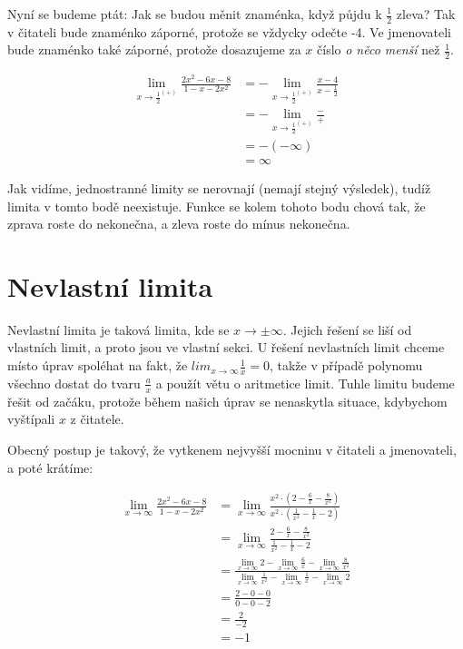 \documentclass[]{article}
\begin{document}
	Nyní se budeme ptát: Jak se budou měnit znaménka, když půjdu k $\frac{1}{2}$ zleva? Tak v čitateli bude znaménko záporné, protože se vždycky odečte -4. Ve jmenovateli bude znaménko také záporné, protože dosazujeme za $x$ číslo \textit{o něco menší} než $\frac{1}{2}$.
	
	\begin{align*}
		\lim_{x \to \frac{1}{2}^{(+)}} \frac{2x^2-6x-8}{1-x-2x^2} &= - \lim_{x \to \frac{1}{2}^{(+)}} \frac{x - 4}{x - \frac{1}{2}} \\
		&= - \lim_{x \to \frac{1}{2}^{(+)}} \frac{-}{+} \\
		&= - (- \infty) \\
		&= \infty
	\end{align*}
	
	Jak vidíme, jednostranné limity se nerovnají (nemají stejný výsledek), tudíž limita v tomto bodě neexistuje. Funkce se kolem tohoto bodu chová tak, že zprava roste do nekonečna, a zleva roste do mínus nekonečna.
	
	\pagebreak
	
	\section{Nevlastní limita}
	Nevlastní limita je taková limita, kde se $x \to \pm \infty$. Jejich řešení se liší od vlastních limit, a proto jsou ve vlastní sekci. U řešení nevlastních limit chceme místo úprav spoléhat na fakt, že $lim_{x\to\infty} \frac{1}{x} = 0$, takže v případě polynomu všechno dostat do tvaru $\frac{a}{x}$ a použít větu o aritmetice limit. Tuhle limitu budeme řešit od začáku, protože během našich úprav se nenaskytla situace, kdybychom vyštípali $x$ z čitatele.
	
	Obecný postup je takový, že vytkenem nejvyšší mocninu v čitateli a jmenovateli, a poté krátíme:
	
		\begin{align*}
		\lim_{x \to \infty} \frac{2x^2-6x-8}{1-x-2x^2} 
		&= \lim_{x \to \infty} \frac{x^2 \cdot (2 - \frac{6}{x} - \frac{8}{x^2})}{x^2 \cdot (\frac{1}{x^2}-\frac{1}{x}-2)} \\
		&= \lim_{x \to \infty} \frac{2 - \frac{6}{x} - \frac{8}{x^2}}{\frac{1}{x^2}-\frac{1}{x}-2} \\
		&= \frac{\lim_{x \to \infty} 2 - \lim_{x \to \infty} \frac{6}{x} - \lim_{x \to \infty} \frac{8}{x^2}}{\lim_{x \to \infty}\frac{1}{x^2}-\lim_{x \to \infty}\frac{1}{x}-\lim_{x \to \infty}2} \\
		&= \frac{2 - 0 - 0}{0 - 0 - 2} \\
		&= \frac{2}{-2} \\
		&= -1
	\end{align*}
	
\end{document}
